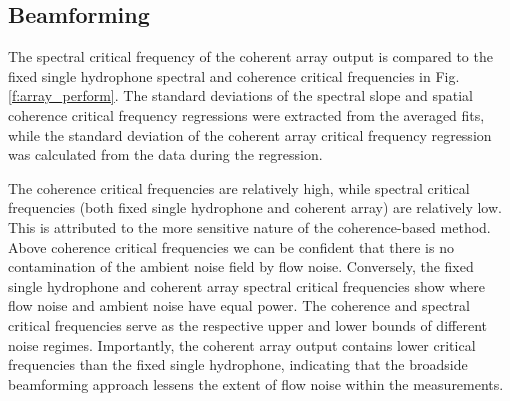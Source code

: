 \documentclass[12pt,journal,onecolumn]{IEEEtran}
\begin{document}



\subsection{Beamforming}
The spectral critical frequency of the coherent array output is compared to the fixed single hydrophone spectral and coherence critical frequencies in Fig. \ref{f:array_perform}. 
The standard deviations of the spectral slope and spatial coherence critical frequency regressions were extracted from the averaged fits, while the standard deviation of the coherent array critical frequency regression was calculated from the data during the regression.

The coherence critical frequencies are relatively high, while spectral critical frequencies (both fixed single hydrophone and coherent array) are relatively low. This is attributed to the more sensitive nature of the coherence-based method. Above coherence critical frequencies we can be confident that there is no contamination of the ambient noise field by flow noise. Conversely, the fixed single hydrophone and coherent array spectral critical frequencies show where flow noise and ambient noise have equal power. The coherence and spectral critical frequencies serve as the respective upper and lower bounds of different noise regimes. Importantly, the coherent array output contains lower critical frequencies than the fixed single hydrophone, indicating that the broadside beamforming approach lessens the extent of flow noise within the measurements. 
\end{document}
